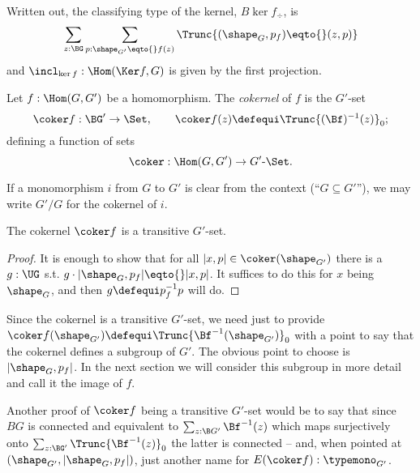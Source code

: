 Written out, the classifying type of the kernel,
$B\ker f_\div$, is $$\sum_{z:\BG}\sum_{p:\shape_{G'}\eqto{}f(z)}\Trunc{(\shape_G,p_f)\eqto{}(z,p)}$$
and $\incl_{\ker f}:\Hom(\Ker f, G)$ is given by the first projection.

\begin{definition}
  \label{def:cokernel}
  Let $f:\Hom(G,G')$  be a homomorphism.
The \emph{cokernel} of $f$ is the $G'$-set
\[
  \coker f:\BG'\to\Set,\qquad \coker f(z)\defequi  \Trunc{(\Bf)^{-1}(z)}_0;
\]
defining a function of sets
\[
  \coker:\Hom(G,G')\to G'\text{-}\Set.\qedhere
\]
\end{definition}

If a monomorphism $i$ from $G$ to $G'$ is clear from the context (``$G\subseteq G'$''), we may write $G'/G$ for the cokernel of $i$.
\begin{lemma}
  \label{lem:coker is transitive}
  The cokernel $\coker f$ is a transitive $G'$-set.
\end{lemma}
\begin{proof}
  It is enough to show that for all $|x,p|\in\coker(\shape_{G'})$ there is a $g:\UG$ s.t. $g\cdot |\shape_G,p_f|\eqto{} |x,p|$.  It suffices to do this for $x$ being $\shape_G$, and then $g\defequi p_f^{-1}p$ will do.
\end{proof}
\begin{remark}
  \label{remark:imageandcokernel}
  Since the cokernel is a transitive $G'$-set, we need just to provide $\coker f(\shape_{G'})\defequi\Trunc{\Bf^{-1}(\shape_{G'})}_0$ with a point to say that the cokernel defines a subgroup of $G'$. The obvious point to choose is $|\shape_G,p_f|$. In the next section we will consider this subgroup in more detail and call it the image of $f$.

Another proof of $\coker f$ being a transitive $G'$-set would be to say that since $BG$ is connected and equivalent to $\sum_{z:\B G'}\Bf^{-1}(z)$ which maps surjectively onto $\sum_{z:\BG'}\Trunc{\Bf^{-1}(z)}_0$ the latter is connected -- and, when pointed at $(\shape_{G'},|\shape_G,p_f|)$, just another name for $E(\coker f):\typemono_{G'}$.
\end{remark}



